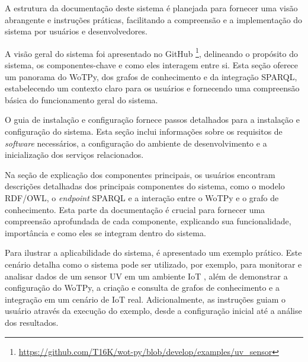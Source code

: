  A estrutura da documentação deste sistema é planejada para fornecer uma visão abrangente e instruções práticas, facilitando a compreensão e a implementação do sistema por usuários e desenvolvedores.

A visão geral do sistema foi apresentado no GitHub \footnote{\url{https://github.com/T16K/wot-py/blob/develop/examples/uv_sensor}}, delineando o propósito do sistema, os componentes-chave e como eles interagem entre si. Esta seção oferece um panorama do WoTPy, dos grafos de conhecimento e da integração SPARQL, estabelecendo um contexto claro para os usuários e fornecendo uma compreensão básica do funcionamento geral do sistema.

O guia de instalação e configuração fornece passos detalhados para a instalação e configuração do sistema. Esta seção inclui informações sobre os requisitos de \textit{software} necessários, a configuração do ambiente de desenvolvimento e a inicialização dos serviços relacionados.

Na seção de explicação dos componentes principais, os usuários encontram descrições detalhadas dos principais componentes do sistema, como o modelo RDF/OWL, o \textit{endpoint} SPARQL e a interação entre o WoTPy e o grafo de conhecimento. Esta parte da documentação é crucial para fornecer uma compreensão aprofundada de cada componente, explicando sua funcionalidade, importância e como eles se integram dentro do sistema.

Para ilustrar a aplicabilidade do sistema, é apresentado um exemplo prático. Este cenário detalha como o sistema pode ser utilizado, por exemplo, para monitorar e analisar dados de um sensor UV em um ambiente IoT \cite{Ariga2023}, além de demonstrar a configuração do WoTPy, a criação e consulta de grafos de conhecimento e a integração em um cenário de IoT real. Adicionalmente, as instruções guiam o usuário através da execução do exemplo, desde a configuração inicial até a análise dos resultados.
